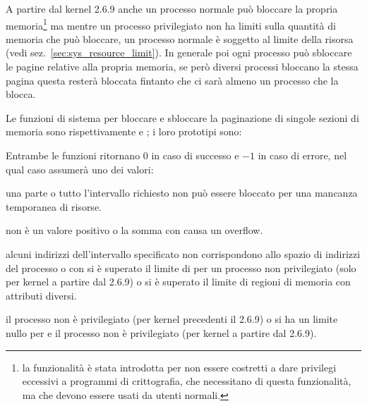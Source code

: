 A partire dal kernel 2.6.9 anche un processo normale può bloccare la propria
memoria\footnote{la funzionalità è stata introdotta per non essere costretti a
  dare privilegi eccessivi a programmi di crittografia, che necessitano di
  questa funzionalità, ma che devono essere usati da utenti normali.} ma
mentre un processo privilegiato non ha limiti sulla quantità di memoria che
può bloccare, un processo normale è soggetto al limite della risorsa
 (vedi sez.~\ref{sec:sys_resource_limit}). In generale
poi ogni processo può sbloccare le pagine relative alla propria memoria, se
però diversi processi bloccano la stessa pagina questa resterà bloccata
fintanto che ci sarà almeno un processo che la blocca.

Le funzioni di sistema per bloccare e sbloccare la paginazione di singole
sezioni di memoria sono rispettivamente  e ; i
loro prototipi sono:

\begin{funcproto}{

  }
{Entrambe le funzioni ritornano $0$ in caso di successo e $-1$ in caso di
  errore, nel qual caso  assumerà uno dei valori:
  \begin{errlist}
  \item[\errcode{EAGAIN}] una parte o tutto l'intervallo richiesto non può
    essere bloccato per una mancanza temporanea di risorse.
  \item[\errcode{EINVAL}]  non è un valore positivo o la somma con
     causa un overflow.
  \item[\errcode{ENOMEM}] alcuni indirizzi dell’intervallo specificato non
    corrispondono allo spazio di indirizzi del processo o con  si
    è superato il limite di  per un processo non
    privilegiato (solo per kernel a partire dal 2.6.9) o si è superato il
    limite di regioni di memoria con attributi diversi.
  \item[\errcode{EPERM}] il processo non è privilegiato (per kernel precedenti
    il 2.6.9) o si ha un limite nullo per  e
    il processo non è privilegiato (per kernel a partire dal 2.6.9).
  \end{errlist}}
\end{funcproto}

